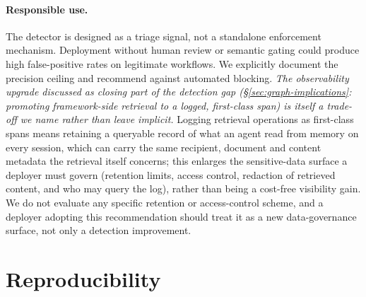 \documentclass{article}
\begin{document}
\paragraph{Responsible use.} The detector is designed as a triage signal, not a standalone enforcement mechanism. Deployment without human review or semantic gating could produce high false-positive rates on legitimate workflows. We explicitly document the precision ceiling and recommend against automated blocking. \emph{The observability upgrade discussed as closing part of the detection gap (\S\ref{sec:graph-implications}: promoting framework-side retrieval to a logged, first-class span) is itself a trade-off we name rather than leave implicit.} Logging retrieval operations as first-class spans means retaining a queryable record of what an agent read from memory on every session, which can carry the same recipient, document and content metadata the retrieval itself concerns; this enlarges the sensitive-data surface a deployer must govern (retention limits, access control, redaction of retrieved content, and who may query the log), rather than being a cost-free visibility gain. We do not evaluate any specific retention or access-control scheme, and a deployer adopting this recommendation should treat it as a new data-governance surface, not only a detection improvement.

\section*{Reproducibility}
\end{document}
